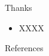 \documentclass[aspectratio=169,12pt,usepdftitle=false]{beamer} %
\begin{document}










\begin{frame}{Thanks}
    \begin{itemize}
        \item XXXX
    \end{itemize}
\end{frame}

\begin{frame}{References}
        \tiny
        
\end{frame}
\end{document}
